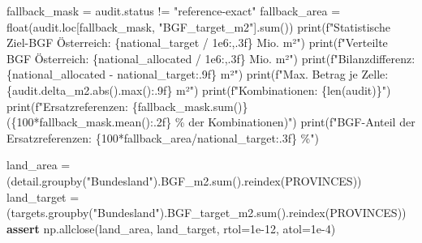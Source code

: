 \documentclass[
  ngerman,
  a4paper,
  DIV=11]{scrreprt}
\newenvironment{Shaded}{\begin{snugshade}}{\end{snugshade}}
\newcommand{\BuiltInTok}[1]{\textcolor[rgb]{0.00,0.23,0.31}{#1}}
\newcommand{\ControlFlowTok}[1]{\textcolor[rgb]{0.00,0.23,0.31}{\textbf{#1}}}
\newcommand{\DecValTok}[1]{\textcolor[rgb]{0.68,0.00,0.00}{#1}}
\newcommand{\FloatTok}[1]{\textcolor[rgb]{0.68,0.00,0.00}{#1}}
\newcommand{\NormalTok}[1]{\textcolor[rgb]{0.00,0.23,0.31}{#1}}
\newcommand{\OperatorTok}[1]{\textcolor[rgb]{0.37,0.37,0.37}{#1}}
\newcommand{\SpecialCharTok}[1]{\textcolor[rgb]{0.37,0.37,0.37}{#1}}
\newcommand{\SpecialStringTok}[1]{\textcolor[rgb]{0.13,0.47,0.30}{#1}}
\newcommand{\StringTok}[1]{\textcolor[rgb]{0.13,0.47,0.30}{#1}}
\begin{document}
\begin{Shaded}
\begin{Highlighting}[]
\NormalTok{fallback\_mask }\OperatorTok{=}\NormalTok{ audit.status }\OperatorTok{!=} \StringTok{"reference{-}exact"}
\NormalTok{fallback\_area }\OperatorTok{=} \BuiltInTok{float}\NormalTok{(audit.loc[fallback\_mask, }\StringTok{"BGF\_target\_m2"}\NormalTok{].}\BuiltInTok{sum}\NormalTok{())}
\BuiltInTok{print}\NormalTok{(}\SpecialStringTok{f"Statistische Ziel{-}BGF Österreich: }\SpecialCharTok{\{}\NormalTok{national\_target }\OperatorTok{/} \FloatTok{1e6}\SpecialCharTok{:,.3f\}}\SpecialStringTok{ Mio. m²"}\NormalTok{)}
\BuiltInTok{print}\NormalTok{(}\SpecialStringTok{f"Verteilte BGF Österreich:        }\SpecialCharTok{\{}\NormalTok{national\_allocated }\OperatorTok{/} \FloatTok{1e6}\SpecialCharTok{:,.3f\}}\SpecialStringTok{ Mio. m²"}\NormalTok{)}
\BuiltInTok{print}\NormalTok{(}\SpecialStringTok{f"Bilanzdifferenz:                 }\SpecialCharTok{\{}\NormalTok{national\_allocated }\OperatorTok{{-}}\NormalTok{ national\_target}\SpecialCharTok{:.9f\}}\SpecialStringTok{ m²"}\NormalTok{)}
\BuiltInTok{print}\NormalTok{(}\SpecialStringTok{f"Max. Betrag je Zelle:           }\SpecialCharTok{\{}\NormalTok{audit}\SpecialCharTok{.}\NormalTok{delta\_m2}\SpecialCharTok{.}\BuiltInTok{abs}\NormalTok{()}\SpecialCharTok{.}\BuiltInTok{max}\NormalTok{()}\SpecialCharTok{:.9f\}}\SpecialStringTok{ m²"}\NormalTok{)}
\BuiltInTok{print}\NormalTok{(}\SpecialStringTok{f"Kombinationen:                  }\SpecialCharTok{\{}\BuiltInTok{len}\NormalTok{(audit)}\SpecialCharTok{\}}\SpecialStringTok{"}\NormalTok{)}
\BuiltInTok{print}\NormalTok{(}\SpecialStringTok{f"Ersatzreferenzen:                }\SpecialCharTok{\{}\NormalTok{fallback\_mask}\SpecialCharTok{.}\BuiltInTok{sum}\NormalTok{()}\SpecialCharTok{\}}\SpecialStringTok{ (}\SpecialCharTok{\{}\DecValTok{100}\OperatorTok{*}\NormalTok{fallback\_mask}\SpecialCharTok{.}\NormalTok{mean()}\SpecialCharTok{:.2f\}}\SpecialStringTok{ \% der Kombinationen)"}\NormalTok{)}
\BuiltInTok{print}\NormalTok{(}\SpecialStringTok{f"BGF{-}Anteil der Ersatzreferenzen: }\SpecialCharTok{\{}\DecValTok{100}\OperatorTok{*}\NormalTok{fallback\_area}\OperatorTok{/}\NormalTok{national\_target}\SpecialCharTok{:.3f\}}\SpecialStringTok{ \%"}\NormalTok{)}

\NormalTok{land\_area }\OperatorTok{=}\NormalTok{ (detail.groupby(}\StringTok{"Bundesland"}\NormalTok{).BGF\_m2.}\BuiltInTok{sum}\NormalTok{().reindex(PROVINCES))}
\NormalTok{land\_target }\OperatorTok{=}\NormalTok{ (targets.groupby(}\StringTok{"Bundesland"}\NormalTok{).BGF\_target\_m2.}\BuiltInTok{sum}\NormalTok{().reindex(PROVINCES))}
\ControlFlowTok{assert}\NormalTok{ np.allclose(land\_area, land\_target, rtol}\OperatorTok{=}\FloatTok{1e{-}12}\NormalTok{, atol}\OperatorTok{=}\FloatTok{1e{-}4}\NormalTok{)}


\end{Highlighting}
\end{Shaded}
\end{document}
